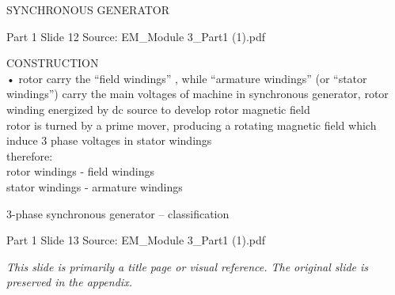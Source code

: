 \documentclass[11pt,a4paper]{article}
\begin{document}
\begin{mdframed}[roundcorner=9pt,backgroundcolor=white,linecolor=anthGreen,linewidth=1pt,innerleftmargin=12pt,innerrightmargin=12pt,innertopmargin=10pt,innerbottommargin=10pt,skipabove=8pt,skipbelow=10pt]
{\HeadingFont\fontsize{15}{18}\selectfont\color{anthDark}SYNCHRONOUS GENERATOR\par}
{\color{anthMid}\small Part 1 \textbullet{} Slide 12 \textbullet{} Source: EM\_Module 3\_Part1 (1).pdf\par}
\vspace{0.5em}
{\small
CONSTRUCTION\\
• rotor carry the “field windings” , while “armature windings” (or “stator windings”) carry the main voltages of machine in synchronous generator, rotor winding energized by dc source to develop rotor magnetic field\\
\smallskip
\textcolor{anthGreen}{\textbullet}\hspace{0.65em}rotor is turned by a prime mover, producing a rotating magnetic field which induce 3 phase voltages in stator windings\\
\smallskip
therefore:\\
\textcolor{anthGreen}{\textbullet}\hspace{0.65em}rotor windings - field windings\\
\textcolor{anthGreen}{\textbullet}\hspace{0.65em}stator windings - armature windings\\

}
\end{mdframed}

\begin{mdframed}[roundcorner=9pt,backgroundcolor=white,linecolor=anthOrange,linewidth=1pt,innerleftmargin=12pt,innerrightmargin=12pt,innertopmargin=10pt,innerbottommargin=10pt,skipabove=8pt,skipbelow=10pt]
{\HeadingFont\fontsize{15}{18}\selectfont\color{anthDark}3-phase synchronous generator – classification\par}
{\color{anthMid}\small Part 1 \textbullet{} Slide 13 \textbullet{} Source: EM\_Module 3\_Part1 (1).pdf\par}
\vspace{0.5em}
{\small
\textit{This slide is primarily a title page or visual reference. The original slide is preserved in the appendix.}

}
\end{mdframed}
\end{document}
